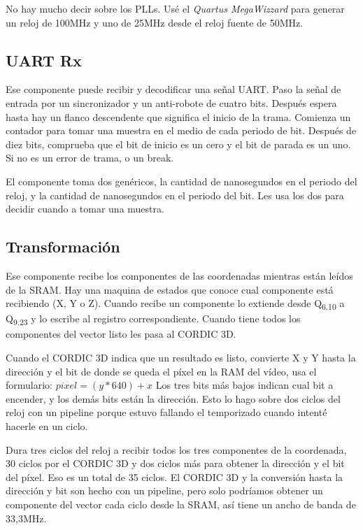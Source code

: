 \documentclass[a4paper]{article}
\begin{document}
No hay mucho decir sobre los PLLs. Usé el \textit{Quartus MegaWizzard} para generar un reloj de 100MHz y uno de 25MHz desde el reloj fuente de 50MHz.

\subsection {UART Rx}

Ese componente puede recibir y decodificar una señal UART. Paso la señal de entrada por un sincronizador y un anti-robote de cuatro bits. Después espera hasta hay un flanco descendente que significa el inicio de la trama. Comienza un contador para tomar una muestra en el medio de cada periodo de bit. Después de diez bits, comprueba que el bit de inicio es un cero y el bit de parada es un uno. Si no es un error de trama, o un break.

El componente toma dos genéricos, la cantidad de nanosegundos en el periodo del reloj, y la cantidad de nanosegundos en el periodo del bit. Les usa los dos para decidir cuando a tomar una muestra.

\subsection {Transformación}

Ese componente recibe los componentes de las coordenadas mientras están leídos de la SRAM. Hay una maquina de estados que conoce cual componente está recibiendo (X, Y o Z). Cuando recibe un componente lo extiende desde Q\textsubscript{6.10} a Q\textsubscript{9.23} y lo escribe al registro correspondiente. Cuando tiene todos los componentes del vector listo les pasa al CORDIC 3D.

Cuando el CORDIC 3D indica que un resultado es listo, convierte X y Y hasta la dirección y el bit de donde se queda el píxel en la RAM del vídeo, usa el formulario: $pixel = (y * 640) + x$ Los tres bits más bajos indican cual bit a encender, y los demás bits están la dirección. Esto lo hago sobre dos ciclos del reloj con un pipeline porque estuvo fallando el temporizado cuando intenté hacerle en un ciclo.

Dura tres ciclos del reloj a recibir todos los tres componentes de la coordenada, 30 ciclos por el CORDIC 3D y dos ciclos más para obtener la dirección y el bit del píxel. Eso es un total de 35 ciclos. El CORDIC 3D y la conversión hasta la dirección y bit son hecho con un pipeline, pero solo podríamos obtener un componente del vector cada ciclo desde la SRAM, así tiene un ancho de banda de 33,3MHz.
\end{document}
